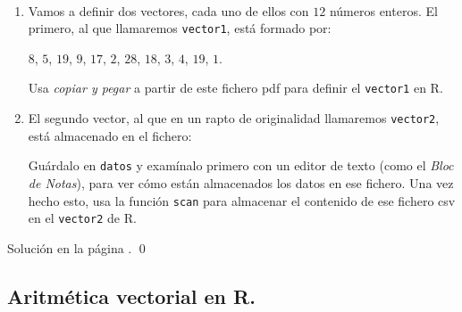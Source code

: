 \documentclass[10pt,a4paper]{article}\usepackage[]{graphicx}\usepackage[]{color}
\newcounter {cont01}
\begin{document}
\begin{ejercicio}
\label{tut02:ejercicio06}
\quad\\
\begin{enumerate}
  \item Vamos a definir dos vectores, cada uno de ellos con $12$ números enteros. El primero, al que llamaremos {\tt vector1}, está formado por:
      \begin{center}
        $8$, $5$, $19$, $9$, $17$, $2$, $28$, $18$, $3$, $4$, $19$, $1$.
      \end{center}
      Usa {\em copiar y pegar} a partir de este fichero pdf para definir el {\tt vector1} en R.

  \item El segundo vector, al que en un rapto de originalidad llamaremos {\tt vector2}, está almacenado en el fichero:
      \begin{center}
      \end{center}
      Guárdalo en {\tt datos} y examínalo primero con un editor de texto (como el {\em Bloc de Notas}), para ver cómo están almacenados los datos en ese fichero. Una vez hecho esto, usa la función {\tt scan} para almacenar el contenido de ese fichero csv en  el {\tt vector2} de R.
\end{enumerate}
Solución en la página \pageref{tut02:ejercicio06:sol}. \qed
\end{ejercicio}

\subsection{Aritmética vectorial en R.}
\label{tut02:subsec:AritmeticaVectorial}
\end{document}
